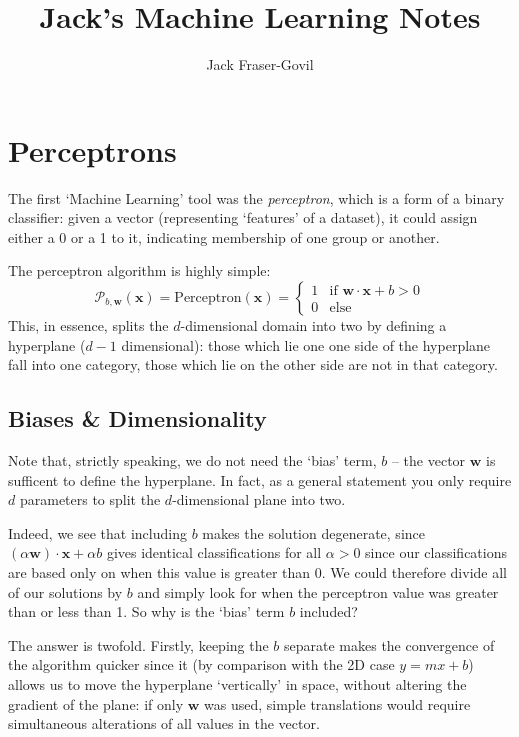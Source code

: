\documentclass[10pt, twocolumn]{article}
\title{Jack's Machine Learning Notes}
\author{Jack Fraser-Govil}
\renewcommand\vec[1]{\boldsymbol{\textbf{#1}}}
\begin{document}
	\maketitle{}

	\section{Perceptrons}

		The first `Machine Learning' tool was the \textit{perceptron}, which is a form of a binary classifier: given a vector (representing `features' of a dataset), it could assign either a 0 or a 1 to it, indicating membership of one group or another. 

		The perceptron algorithm is highly simple:
		\begin{equation}
			\mathcal{P}_{b,\vec{w}}(\vec{x}) = \text{Perceptron}(\vec{x}) = \begin{cases} 1 & \text{if } \vec{w} \cdot \vec{x} + b > 0 \\ 0 & \text{else} \end{cases}
		\end{equation}
		This, in essence, splits the $d$-dimensional domain into two by defining a hyperplane ($d-1$ dimensional): those which lie one one side of the hyperplane fall into one category, those which lie on the other side are not in that category. 
		
		\subsection{Biases \& Dimensionality}
		Note that, strictly speaking, we do not need the `bias' term, $b$ -- the vector $\vec{w}$ is sufficent to define the hyperplane. In fact, as a general statement you only require $d$ parameters to split the $d$-dimensional plane into two. 
		
		Indeed, we see that including $b$ makes the solution degenerate, since $(\alpha \vec{w}) \cdot \vec{x} + \alpha b$ gives identical classifications for all $\alpha > 0$ since our classifications are based only on when this value is greater than 0. We could therefore divide all of our solutions by $b$ and simply look for when the perceptron value was greater than or less than 1. So why is the `bias' term $b$ included?
		
		The answer is twofold. Firstly, keeping the $b$ separate makes the convergence of the algorithm quicker since it (by comparison with the 2D case $y= mx + b$) allows us to move the hyperplane `vertically' in space, without altering the gradient of the plane: if only $\vec{w}$ was used, simple translations would require simultaneous alterations of all values in the vector. 
		
\end{document}
